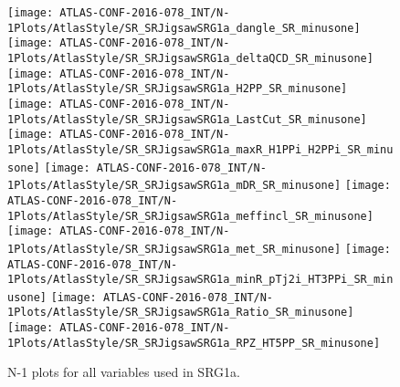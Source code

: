 \begin{figure}[tbp]
\begin{center}
\texttt{[image: ATLAS-CONF-2016-078\_INT/N-1Plots/AtlasStyle/SR\_SRJigsawSRG1a\_dangle\_SR\_minusone]}
\texttt{[image: ATLAS-CONF-2016-078\_INT/N-1Plots/AtlasStyle/SR\_SRJigsawSRG1a\_deltaQCD\_SR\_minusone]}
\texttt{[image: ATLAS-CONF-2016-078\_INT/N-1Plots/AtlasStyle/SR\_SRJigsawSRG1a\_H2PP\_SR\_minusone]}
\texttt{[image: ATLAS-CONF-2016-078\_INT/N-1Plots/AtlasStyle/SR\_SRJigsawSRG1a\_LastCut\_SR\_minusone]}
\texttt{[image: ATLAS-CONF-2016-078\_INT/N-1Plots/AtlasStyle/SR\_SRJigsawSRG1a\_maxR\_H1PPi\_H2PPi\_SR\_minusone]}
\texttt{[image: ATLAS-CONF-2016-078\_INT/N-1Plots/AtlasStyle/SR\_SRJigsawSRG1a\_mDR\_SR\_minusone]}
\texttt{[image: ATLAS-CONF-2016-078\_INT/N-1Plots/AtlasStyle/SR\_SRJigsawSRG1a\_meffincl\_SR\_minusone]}
\texttt{[image: ATLAS-CONF-2016-078\_INT/N-1Plots/AtlasStyle/SR\_SRJigsawSRG1a\_met\_SR\_minusone]}
\texttt{[image: ATLAS-CONF-2016-078\_INT/N-1Plots/AtlasStyle/SR\_SRJigsawSRG1a\_minR\_pTj2i\_HT3PPi\_SR\_minusone]}
\texttt{[image: ATLAS-CONF-2016-078\_INT/N-1Plots/AtlasStyle/SR\_SRJigsawSRG1a\_Ratio\_SR\_minusone]}
\texttt{[image: ATLAS-CONF-2016-078\_INT/N-1Plots/AtlasStyle/SR\_SRJigsawSRG1a\_RPZ\_HT5PP\_SR\_minusone]}
\end{center}
\caption{N-1 plots for all variables used in SRG1a.}
\label{fig:SR_SRJigsawSRG1a_maxR_H1PPi_H2PPi_SR_minusone}
\end{figure}

